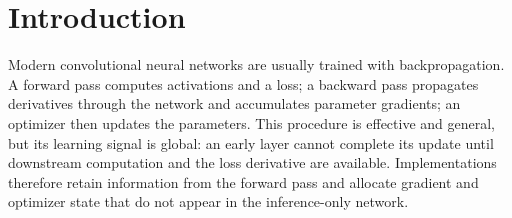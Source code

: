 \documentclass{article}
\begin{document}
\begin{abstract}
    
    \end{abstract}
    
    \vspace{1em}
    
    \section{Introduction}
    
    Modern convolutional neural networks are usually trained with backpropagation. A forward pass computes activations and a loss; a backward pass propagates derivatives through the network and accumulates parameter gradients; an optimizer then updates the parameters. This procedure is effective and general, but its learning signal is global: an early layer cannot complete its update until downstream computation and the loss derivative are available. Implementations therefore retain information from the forward pass and allocate gradient and optimizer state that do not appear in the inference-only network.
    
\end{document}
